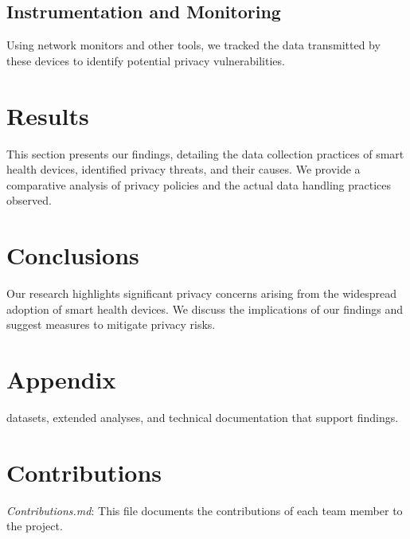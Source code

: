 \documentclass[12pt]{article}
\begin{document}
\subsection{Instrumentation and Monitoring}
Using network monitors and other tools, we tracked the data transmitted by these devices to identify potential privacy vulnerabilities.

\section{Results}
This section presents our findings, detailing the data collection practices of smart health devices, identified privacy threats, and their causes. We provide a comparative analysis of privacy policies and the actual data handling practices observed.

\section{Conclusions}
Our research highlights significant privacy concerns arising from the widespread adoption of smart health devices. We discuss the implications of our findings and suggest measures to mitigate privacy risks.

\section{Appendix}
 datasets, extended analyses, and technical documentation that support findings.

\section{Contributions}
\textit{Contributions.md}: This file documents the contributions of each team member to the project.



\end{document}
